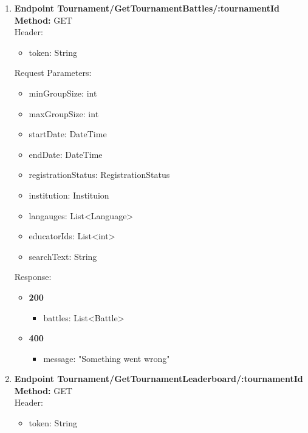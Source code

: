 \begin{enumerate}
    \item \textbf{Endpoint Tournament/GetTournamentBattles/:tournamentId} \\
    \textbf{Method:} GET \\
    Header:\\
    \begin{itemize}
        \item token: String
    \end{itemize}
    Request Parameters:\\
    \begin{itemize}
        \item minGroupSize: int
        \item maxGroupSize: int
        \item startDate: DateTime
        \item endDate: DateTime
        \item registrationStatus: RegistrationStatus
        \item institution: Instituion
        \item langauges: List<Language>
        \item educatorIds: List<int>
        \item searchText: String
    \end{itemize}
    Response:\\
    \begin{itemize}
        \item \textbf{200} \\
        \begin{itemize}
            \item battles: List<Battle>
        \end{itemize}
        \item \textbf{400} \\
        \begin{itemize}
            \item message: "Something went wrong"
        \end{itemize}
    \end{itemize}
    \item \textbf{Endpoint Tournament/GetTournamentLeaderboard/:tournamentId} \\
    \textbf{Method:} GET \\
    Header:\\
    \begin{itemize}
        \item token: String
    \end{itemize}

\end{enumerate}
